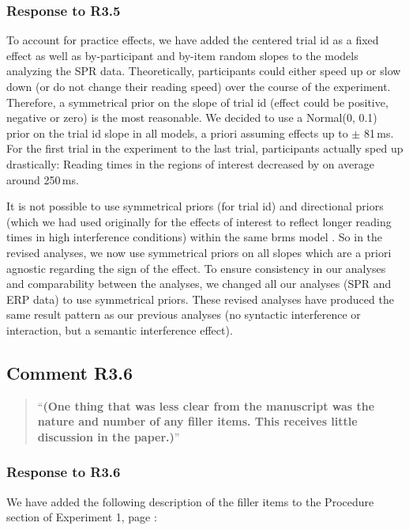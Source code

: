 \documentclass[12pt]{article}
\begin{document}
\subsubsection*{Response to R3.5}
To account for practice effects, we have added the centered trial id as a fixed effect as well as by-participant and by-item random slopes to the models analyzing the SPR data. Theoretically, participants could either speed up or slow down (or do not change their reading speed) over the course of the experiment. Therefore, a symmetrical prior on the slope of trial id (effect could be positive, negative or zero) is the most reasonable. We decided to use a Normal(0, 0.1) prior on the trial id slope in all models, a priori assuming effects up to $\pm$ 81\,ms. For the first trial in the experiment to the last trial, participants actually sped up drastically: Reading times in the regions of interest decreased by on average around 250\,ms. 

It is not possible to use symmetrical priors (for trial id) and directional priors (which we had used originally for the effects of interest to reflect longer reading times in high interference conditions) within the same brms model \citep{brms}. So in the revised analyses, we now use symmetrical priors on all slopes which are a priori agnostic regarding the sign of the effect. To ensure consistency in our analyses and comparability between the analyses, we changed all our analyses (SPR and ERP data) to use symmetrical priors. These revised analyses have produced the same result pattern as our previous analyses (no syntactic interference or interaction, but a semantic interference effect).

\subsection*{Comment R3.6}
\begin{quote}
``\textbf{(One thing that was less clear from the manuscript was the nature and number of any filler items. This receives little discussion in the paper.)}''
\end{quote}


\subsubsection*{Response to R3.6}
We have added the following description of the filler items to the Procedure section of Experiment 1, page \pageref{fillers1}:

\begin{quote}
\end{quote}
\end{document}
